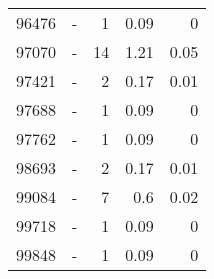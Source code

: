 \begin{longtable}{lXrrr}
        96476 & \multicolumn{1}{X}{-} & %
          \num{1} &
          \num[round-mode=places,round-precision=2]{0.09} &
          \num[round-mode=places,round-precision=2]{0} \\

        97070 & \multicolumn{1}{X}{-} & %
          \num{14} &
          \num[round-mode=places,round-precision=2]{1.21} &
          \num[round-mode=places,round-precision=2]{0.05} \\

        97421 & \multicolumn{1}{X}{-} & %
          \num{2} &
          \num[round-mode=places,round-precision=2]{0.17} &
          \num[round-mode=places,round-precision=2]{0.01} \\

        97688 & \multicolumn{1}{X}{-} & %
          \num{1} &
          \num[round-mode=places,round-precision=2]{0.09} &
          \num[round-mode=places,round-precision=2]{0} \\

        97762 & \multicolumn{1}{X}{-} & %
          \num{1} &
          \num[round-mode=places,round-precision=2]{0.09} &
          \num[round-mode=places,round-precision=2]{0} \\

        98693 & \multicolumn{1}{X}{-} & %
          \num{2} &
          \num[round-mode=places,round-precision=2]{0.17} &
          \num[round-mode=places,round-precision=2]{0.01} \\

        99084 & \multicolumn{1}{X}{-} & %
          \num{7} &
          \num[round-mode=places,round-precision=2]{0.6} &
          \num[round-mode=places,round-precision=2]{0.02} \\

        99718 & \multicolumn{1}{X}{-} & %
          \num{1} &
          \num[round-mode=places,round-precision=2]{0.09} &
          \num[round-mode=places,round-precision=2]{0} \\

        99848 & \multicolumn{1}{X}{-} & %
          \num{1} &
          \num[round-mode=places,round-precision=2]{0.09} &
          \num[round-mode=places,round-precision=2]{0} \\


\end{longtable}
